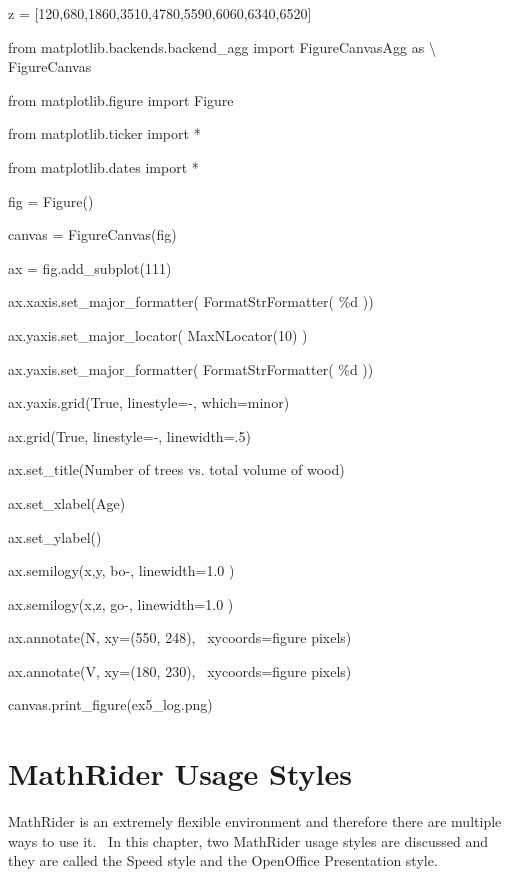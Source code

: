 \documentclass[12pt,twoside]{book}
\begin{document}
z = [120,680,1860,3510,4780,5590,6060,6340,6520]


\bigskip

from matplotlib.backends.backend\_agg import FigureCanvasAgg as
{\textbackslash} FigureCanvas

from matplotlib.figure import Figure

from matplotlib.ticker import *

from matplotlib.dates import *

fig = Figure()

canvas = FigureCanvas(fig)

ax = fig.add\_subplot(111)

ax.xaxis.set\_major\_formatter( FormatStrFormatter(
{\textquotesingle}\%d{\textquotesingle} ))

ax.yaxis.set\_major\_locator( MaxNLocator(10) )

ax.yaxis.set\_major\_formatter( FormatStrFormatter(
{\textquotesingle}\%d{\textquotesingle} ))

ax.yaxis.grid(True, linestyle={\textquotesingle}{}-{\textquotesingle},
which={\textquotesingle}minor{\textquotesingle})

ax.grid(True, linestyle={\textquotesingle}{}-{\textquotesingle},
linewidth=.5)

ax.set\_title({\textquotesingle}Number of trees vs. total volume of
wood{\textquotesingle})

ax.set\_xlabel({\textquotesingle}Age{\textquotesingle})

ax.set\_ylabel({\textquotesingle}{\textquotesingle})

ax.semilogy(x,y, {\textquotesingle}bo{}-{\textquotesingle},
linewidth=1.0 )

ax.semilogy(x,z, {\textquotesingle}go{}-{\textquotesingle},
linewidth=1.0 )

ax.annotate({\textquotesingle}N{\textquotesingle}, xy=(550, 248),
\ xycoords={\textquotesingle}figure pixels{\textquotesingle})

ax.annotate({\textquotesingle}V{\textquotesingle}, xy=(180, 230),
\ xycoords={\textquotesingle}figure pixels{\textquotesingle})

canvas.print\_figure({\textquotesingle}ex5\_log.png{\textquotesingle})

{\textbar}


\bigskip

\chapter[MathRider Usage Styles]{MathRider Usage Styles}
MathRider is an extremely flexible environment and therefore there are
multiple ways to use it. \ In this chapter, two MathRider usage styles
are discussed and they are called the Speed style and the OpenOffice
Presentation style.
\end{document}
